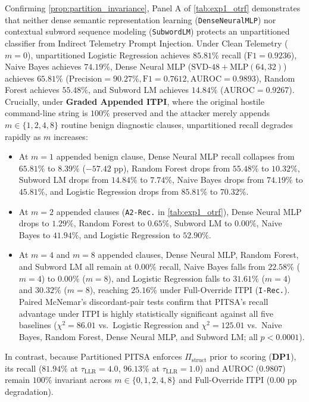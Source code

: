 \documentclass[11pt,a4paper]{article}
\let\oldtexttt\texttt
\renewcommand{\texttt}[1]{\textnormal{\oldtexttt{#1}}}
\begin{document}
Confirming \cref{prop:partition_invariance}, Panel A of \cref{tab:exp1_otrf} demonstrates that neither dense semantic representation learning (\texttt{DenseNeuralMLP}) nor contextual subword sequence modeling (\texttt{SubwordLM}) protects an unpartitioned classifier from Indirect Telemetry Prompt Injection. Under Clean Telemetry ($m=0$), unpartitioned Logistic Regression achieves $85.81\%$ recall ($\text{F1} = 0.9236$), Naive Bayes achieves $74.19\%$, Dense Neural MLP ($\text{SVD-48} + \text{MLP}(64,32)$) achieves $65.81\%$ ($\text{Precision} = 90.27\%, \text{F1} = 0.7612, \text{AUROC} = 0.9893$), Random Forest achieves $55.48\%$, and Subword LM achieves $14.84\%$ ($\text{AUROC} = 0.9267$). Crucially, under \textbf{Graded Appended ITPI}, where the original hostile command-line string is $100\%$ preserved and the attacker merely appends $m \in \{1, 2, 4, 8\}$ routine benign diagnostic clauses, unpartitioned recall degrades rapidly as $m$ increases:
\begin{itemize}
  \item At $m = 1$ appended benign clause, Dense Neural MLP recall collapses from $65.81\%$ to $8.39\%$ ($-57.42\text{ pp}$), Random Forest drops from $55.48\%$ to $10.32\%$, Subword LM drops from $14.84\%$ to $7.74\%$, Naive Bayes drops from $74.19\%$ to $45.81\%$, and Logistic Regression drops from $85.81\%$ to $70.32\%$.
  \item At $m = 2$ appended clauses (\texttt{A2-Rec.} in \cref{tab:exp1_otrf}), Dense Neural MLP drops to $1.29\%$, Random Forest to $0.65\%$, Subword LM to $0.00\%$, Naive Bayes to $41.94\%$, and Logistic Regression to $52.90\%$.
  \item At $m = 4$ and $m = 8$ appended clauses, Dense Neural MLP, Random Forest, and Subword LM all remain at $0.00\%$ recall, Naive Bayes falls from $22.58\%$ ($m=4$) to $0.00\%$ ($m=8$), and Logistic Regression falls to $31.61\%$ ($m=4$) and $30.32\%$ ($m=8$), reaching $25.16\%$ under Full-Override ITPI (\texttt{I-Rec.}). Paired McNemar's discordant-pair tests confirm that PITSA's recall advantage under ITPI is highly statistically significant against all five baselines ($\chi^2 = 86.01$ vs.\ Logistic Regression and $\chi^2 = 125.01$ vs.\ Naive Bayes, Random Forest, Dense Neural MLP, and Subword LM; all $p < 0.0001$).
\end{itemize}
In contrast, because Partitioned PITSA enforces $\Pi_{\text{struct}}$ prior to scoring (\textbf{DP1}), its recall ($81.94\%$ at $\tau_{\text{LLR}} = 4.0$, $96.13\%$ at $\tau_{\text{LLR}} = 1.0$) and $\text{AUROC}$ ($0.9807$) remain $100\%$ invariant across $m \in \{0, 1, 2, 4, 8\}$ and Full-Override ITPI ($0.00\text{ pp}$ degradation).
\end{document}
